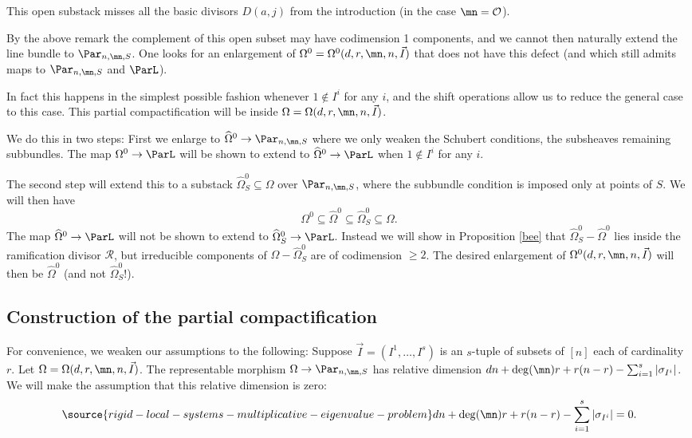 \begin{remark}
\notready\label{explainmore}
This open substack misses all the basic divisors $D(a,j)$ from the introduction (in the case $\mn=\mathcal{O}$).
\end{remark}
By the above remark the complement of this open subset may have codimension 1 components, and we cannot then naturally extend the line bundle to  $\Par_{n,\mn,S}$. One looks for an enlargement of   $\Omega^0=\Omega^0(d,r,\mn,n,\vec{I})$ that does not have this defect (and which still admits maps to $\Par_{n,\mn,S} $ and $\ParL$).

In fact this happens in the simplest possible fashion whenever $1\not\in I^i$ for any $i$, and the shift operations allow us to reduce the general case to this case. This partial compactification will be inside $\Omega=\Omega(d,r,\mn,n,\vec{I})$.

 We do this in two steps: First we enlarge to $\widehat{\Omega}^0\to \Par_{n,\mn,S}$ where we only weaken the Schubert conditions, the subsheaves remaining subbundles. The map   $\Omega^0\to \ParL$ will be shown to extend to $\widehat{\Omega}^0\to \ParL$ when $1\not\in I^i$ for any $i$.

The second step will extend this to a substack  $\widehat{\Omega}_{S}^0\subseteq \Omega$ over $\Par_{n,\mn,S}$, where the subbundle condition is imposed only at points of $S$. We will then have
$$\Omega^0\subseteq \widehat{\Omega}^0\subseteq \widehat{\Omega}_{S}^0\subseteq \Omega.$$ The map $\widehat{\Omega}^0\to \ParL$ will not be shown to extend to $\widehat{\Omega}_{S}^0\to \ParL$. Instead we will show in Proposition \ref{bee} that   $\widehat{\Omega}_{S}^0-  \widehat{\Omega}^0$ lies inside the ramification divisor $\mathcal{R}$, but  irreducible components of $\Omega-\widehat{\Omega}_{S}^0$ are of codimension $\geq 2$. The desired enlargement of $\Omega^0(d,r,\mn,n,\vec{I})$ will then be $\widehat{\Omega}^0$ (and not $\widehat{\Omega}_{S}^0$!).
\subsection{Construction of the partial compactification}
For convenience, we weaken our assumptions to the following:
Suppose $\vec{I}=(I^1,\dots,I^s)$ is an $s$-tuple of subsets  of $[n]$ each of cardinality $r$. Let $\Omega=\Omega(d,r,\mn,n,\vec{I})$.  The representable morphism $\Omega\to \Par_{n,\mn,S}$ has relative dimension $dn +\deg(\mn)r +r(n-r)-\sum_{i=1}^s |\sigma_{I^i}|$. We will make the assumption that this relative dimension is zero:
\begin{equation}\label{timer}
\source{rigid-local-systems-multiplicative-eigenvalue-problem}
dn +\deg(\mn)r +r(n-r)-\sum_{i=1}^s |\sigma_{I^i}|=0.
\end{equation}

